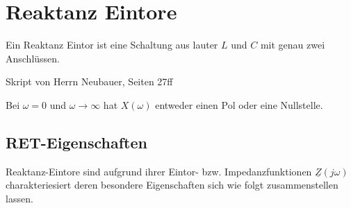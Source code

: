 \section{Reaktanz Eintore}
Ein Reaktanz Eintor ist eine Schaltung aus lauter $L$ und $C$ mit genau zwei
Anschlüssen.

Skript von Herrn Neubauer, Seiten 27ff

Bei $\omega = 0$ und $\omega \rightarrow \infty$ hat $X(\omega)$ entweder einen
Pol oder eine Nullstelle.

\subsection{RET-Eigenschaften}
Reaktanz-Eintore sind aufgrund ihrer Eintor- bzw. Impedanzfunktionen
$\underline{Z}(j\omega)$ charakteriesiert deren besondere
Eigenschaften sich wie folgt zusammenstellen lassen.

